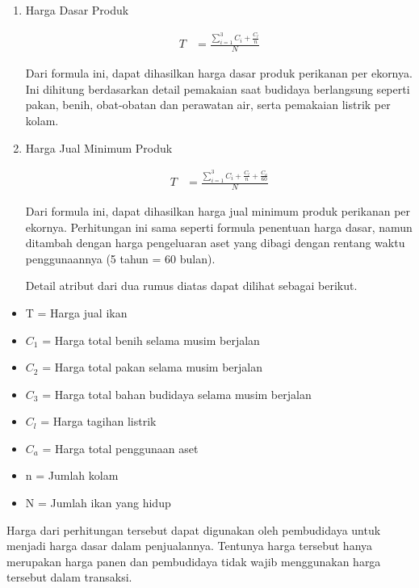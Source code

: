 \begin{enumerate}
	\item Harga Dasar Produk
	
	\begin{equation}
		\begin{split}
			T
			&= \frac{\sum_{i=1}^3 C_i + \frac{C_l}{n}}{N}
		\end{split}
	\end{equation}

	Dari formula ini, dapat dihasilkan harga dasar produk perikanan per ekornya. Ini dihitung berdasarkan detail pemakaian saat budidaya berlangsung seperti pakan, benih, obat-obatan dan perawatan air, serta pemakaian listrik per kolam.

	\item Harga Jual Minimum Produk
	
	\begin{equation}
		\begin{split}
			T
			&= \frac{\sum_{i=1}^3 C_i + \frac{C_l}{n} + \frac{C_a}{60}}{N}
		\end{split}
	\end{equation}

	Dari formula ini, dapat dihasilkan harga jual minimum produk perikanan per ekornya. Perhitungan ini sama seperti formula penentuan harga dasar, namun ditambah dengan harga pengeluaran aset yang dibagi dengan rentang waktu penggunaannya (5 tahun = 60 bulan).

	Detail atribut dari dua rumus diatas dapat dilihat sebagai berikut.

\end{enumerate}

\begin{itemize}
	\item T = Harga jual ikan
	\item $C_1$ = Harga total benih selama musim berjalan
	\item $C_2$ = Harga total pakan selama musim berjalan
	\item $C_3$ = Harga total bahan budidaya selama musim berjalan
	\item $C_l$ = Harga tagihan listrik
	\item $C_a$ = Harga total penggunaan aset
	\item n = Jumlah kolam
	\item N = Jumlah ikan yang hidup
\end{itemize}	

Harga dari perhitungan tersebut dapat digunakan oleh pembudidaya untuk menjadi harga dasar dalam penjualannya. Tentunya harga tersebut hanya merupakan harga panen dan pembudidaya tidak wajib menggunakan harga tersebut dalam transaksi.

